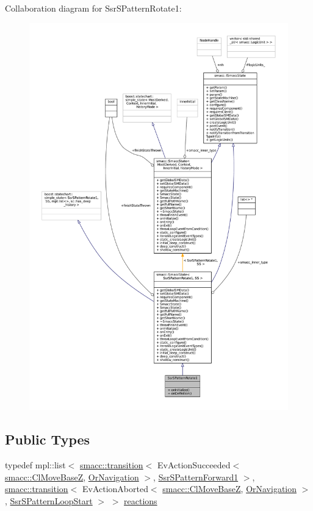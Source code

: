 Collaboration diagram for Ssr\+S\+Pattern\+Rotate1\+:
\nopagebreak
\begin{figure}[H]
\begin{center}
\leavevmode
\includegraphics[width=350pt]{structSsrSPatternRotate1__coll__graph}
\end{center}
\end{figure}
\subsection*{Public Types}
\begin{DoxyCompactItemize}
\item 
typedef mpl\+::list$<$ \hyperlink{classsmacc_1_1transition}{smacc\+::transition}$<$ Ev\+Action\+Succeeded$<$ \hyperlink{classsmacc_1_1ClMoveBaseZ}{smacc\+::\+Cl\+Move\+BaseZ}, \hyperlink{classOrNavigation}{Or\+Navigation} $>$, \hyperlink{structSsrSPatternForward1}{Ssr\+S\+Pattern\+Forward1} $>$, \hyperlink{classsmacc_1_1transition}{smacc\+::transition}$<$ Ev\+Action\+Aborted$<$ \hyperlink{classsmacc_1_1ClMoveBaseZ}{smacc\+::\+Cl\+Move\+BaseZ}, \hyperlink{classOrNavigation}{Or\+Navigation} $>$, \hyperlink{structSsrSPatternLoopStart}{Ssr\+S\+Pattern\+Loop\+Start} $>$ $>$ \hyperlink{structSsrSPatternRotate1_a47facb02d41f2e17a062221c111a4457}{reactions}
\end{DoxyCompactItemize}
